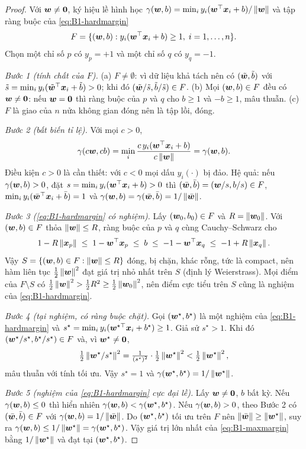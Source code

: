 \begin{proof}
Với $\bm{w} \ne \bm{0}$, ký hiệu lề hình học
$\gamma(\bm{w}, b) = \min_i y_i(\bm{w}^{\top}\bm{x}_i + b)/\left\lVert \bm{w} \right\rVert$ và tập ràng buộc của \eqref{eq:B1-hardmargin}
\[
  F = \{(\bm{w}, b) : y_i(\bm{w}^{\top}\bm{x}_i + b) \ge 1, \; i = 1, \dots, n\}.
\]
Chọn một chỉ số $p$ có $y_p = +1$ và một chỉ số $q$ có $y_q = -1$.

\emph{Bước 1 (tính chất của $F$).}
(a) $F \ne \emptyset$: vì dữ liệu khả tách nên có $(\tilde{\bm{w}}, \tilde b)$ với
$\tilde s = \min_i y_i(\tilde{\bm{w}}^{\top}\bm{x}_i + \tilde b) > 0$; khi đó
$(\tilde{\bm{w}}/\tilde s, \tilde b/\tilde s) \in F$.
(b) Mọi $(\bm{w}, b) \in F$ đều có $\bm{w} \ne \bm{0}$: nếu $\bm{w} = \bm{0}$ thì ràng buộc của $p$ và $q$
cho $b \ge 1$ và $-b \ge 1$, mâu thuẫn.
(c) $F$ là giao của $n$ nửa không gian đóng nên là tập lồi, đóng.

\emph{Bước 2 (bất biến tỉ lệ).} Với mọi $c > 0$,
\[
  \gamma(c\bm{w}, cb) = \min_i \frac{c\, y_i(\bm{w}^{\top}\bm{x}_i + b)}{c\left\lVert \bm{w} \right\rVert} = \gamma(\bm{w}, b).
\]
Điều kiện $c > 0$ là cần thiết: với $c < 0$ mọi dấu $y_i(\cdot)$ bị đảo.
Hệ quả: nếu $\gamma(\bm{w}, b) > 0$, đặt $s = \min_i y_i(\bm{w}^{\top}\bm{x}_i + b) > 0$ thì
$(\bar{\bm{w}}, \bar b) = (\bm{w}/s, b/s) \in F$, $\min_i y_i(\bar{\bm{w}}^{\top}\bm{x}_i + \bar b) = 1$ và
$\gamma(\bm{w}, b) = \gamma(\bar{\bm{w}}, \bar b) = 1/\left\lVert \bar{\bm{w}} \right\rVert$.

\emph{Bước 3 (\eqref{eq:B1-hardmargin} có nghiệm).} Lấy $(\bm{w}_0, b_0) \in F$ và $R = \left\lVert \bm{w}_0 \right\rVert$.
Với $(\bm{w}, b) \in F$ thỏa $\left\lVert \bm{w} \right\rVert \le R$, ràng buộc của $p$ và $q$ cùng Cauchy--Schwarz cho
\[
  1 - R\left\lVert \bm{x}_p \right\rVert \;\le\; 1 - \bm{w}^{\top}\bm{x}_p \;\le\; b \;\le\; -1 - \bm{w}^{\top}\bm{x}_q \;\le\; -1 + R\left\lVert \bm{x}_q \right\rVert.
\]
Vậy $S = \{(\bm{w}, b) \in F : \left\lVert \bm{w} \right\rVert \le R\}$ đóng, bị chặn, khác rỗng, tức là compact,
nên hàm liên tục $\frac12\left\lVert \bm{w} \right\rVert^2$ đạt giá trị nhỏ nhất trên $S$ (định lý Weierstrass).
Mọi điểm của $F \setminus S$ có $\frac12\left\lVert \bm{w} \right\rVert^2 > \frac12 R^2 \ge \frac12\left\lVert \bm{w}_0 \right\rVert^2$,
nên điểm cực tiểu trên $S$ cũng là nghiệm của \eqref{eq:B1-hardmargin}.

\emph{Bước 4 (tại nghiệm, có ràng buộc chặt).} Gọi $(\bm{w}^\star, b^\star)$ là một nghiệm của
\eqref{eq:B1-hardmargin} và $s^\star = \min_i y_i(\bm{w}^{\star\top}\bm{x}_i + b^\star) \ge 1$.
Giả sử $s^\star > 1$. Khi đó $(\bm{w}^\star/s^\star, b^\star/s^\star) \in F$ và, vì $\bm{w}^\star \ne \bm{0}$,
\[
  \tfrac12\left\lVert \bm{w}^\star/s^\star \right\rVert^2 = \tfrac{1}{(s^\star)^2}\cdot\tfrac12\left\lVert \bm{w}^\star \right\rVert^2
  < \tfrac12\left\lVert \bm{w}^\star \right\rVert^2,
\]
mâu thuẫn với tính tối ưu. Vậy $s^\star = 1$ và $\gamma(\bm{w}^\star, b^\star) = 1/\left\lVert \bm{w}^\star \right\rVert$.

\emph{Bước 5 (nghiệm của \eqref{eq:B1-hardmargin} cực đại lề).} Lấy $\bm{w} \ne \bm{0}$, $b$ bất kỳ.
Nếu $\gamma(\bm{w}, b) \le 0$ thì hiển nhiên $\gamma(\bm{w}, b) < \gamma(\bm{w}^\star, b^\star)$.
Nếu $\gamma(\bm{w}, b) > 0$, theo Bước 2 có $(\bar{\bm{w}}, \bar b) \in F$ với
$\gamma(\bm{w}, b) = 1/\left\lVert \bar{\bm{w}} \right\rVert$. Do $(\bm{w}^\star, b^\star)$ tối ưu trên $F$ nên
$\left\lVert \bar{\bm{w}} \right\rVert \ge \left\lVert \bm{w}^\star \right\rVert$, suy ra $\gamma(\bm{w}, b) \le 1/\left\lVert \bm{w}^\star \right\rVert = \gamma(\bm{w}^\star, b^\star)$.
Vậy giá trị lớn nhất của \eqref{eq:B1-maxmargin} bằng $1/\left\lVert \bm{w}^\star \right\rVert$ và đạt tại $(\bm{w}^\star, b^\star)$.


\end{proof}
